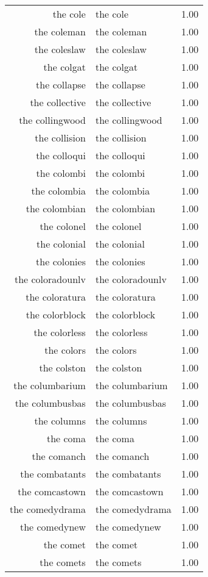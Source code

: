 \begin{table}[ht]
\begin{tabular}{rlr}
  the cole & the cole & 1.00 \\ 
  the coleman & the coleman & 1.00 \\ 
  the coleslaw & the coleslaw & 1.00 \\ 
  the colgat & the colgat & 1.00 \\ 
  the collapse & the collapse & 1.00 \\ 
  the collective & the collective & 1.00 \\ 
  the collingwood & the collingwood & 1.00 \\ 
  the collision & the collision & 1.00 \\ 
  the colloqui & the colloqui & 1.00 \\ 
  the colombi & the colombi & 1.00 \\ 
  the colombia & the colombia & 1.00 \\ 
  the colombian & the colombian & 1.00 \\ 
  the colonel & the colonel & 1.00 \\ 
  the colonial & the colonial & 1.00 \\ 
  the colonies & the colonies & 1.00 \\ 
  the coloradounlv & the coloradounlv & 1.00 \\ 
  the coloratura & the coloratura & 1.00 \\ 
  the colorblock & the colorblock & 1.00 \\ 
  the colorless & the colorless & 1.00 \\ 
  the colors & the colors & 1.00 \\ 
  the colston & the colston & 1.00 \\ 
  the columbarium & the columbarium & 1.00 \\ 
  the columbusbas & the columbusbas & 1.00 \\ 
  the columns & the columns & 1.00 \\ 
  the coma & the coma & 1.00 \\ 
  the comanch & the comanch & 1.00 \\ 
  the combatants & the combatants & 1.00 \\ 
  the comcastown & the comcastown & 1.00 \\ 
  the comedydrama & the comedydrama & 1.00 \\ 
  the comedynew & the comedynew & 1.00 \\ 
  the comet & the comet & 1.00 \\ 
  the comets & the comets & 1.00 \\ 

\end{tabular}
\end{table}
